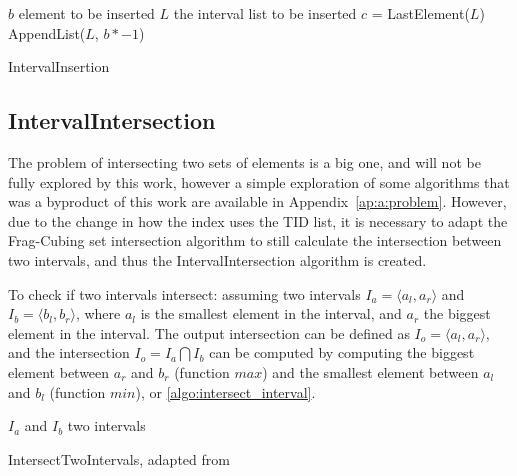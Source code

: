 \begin{algorithm}[H]
\SetAlgoLined
{}
 $b$ element to be inserted\;
 $L$ the interval list to be inserted\;
 $c$ = LastElement($L$)\;
 AppendList($L$, $b * - 1$) 
 \caption{IntervalInsertion}\label{algo:interval_insertion}
\end{algorithm}

\subsection{IntervalIntersection}\label{ch:interval:algo:intersection}

The problem of intersecting two sets of elements is a big one, and will not be fully explored by this work, however a simple exploration of some algorithms that was a byproduct of this work are available in Appendix~\ref{ap:a:problem}.
However, due to the change in how the index uses the TID list, it is necessary to adapt the Frag-Cubing set intersection algorithm to still calculate the intersection between two intervals, and thus the IntervalIntersection algorithm is created.

To check if two intervals intersect: assuming two intervals $I_a = \langle a_l, a_r \rangle$ and $I_b = \langle b_l, b_r \rangle$, where $a_l$ is the smallest element in the interval, and $a_r$ the biggest element in the interval.
The output intersection can be defined as $I_o = \langle a_l, a_r \rangle$, and the intersection $I_o = I_a \bigcap I_b$ can be computed by computing the biggest element between $a_r$ and $b_r$ (function $max$) and the smallest element between $a_l$ and $b_l$ (function $min$), or \autoref{algo:intersect_interval}.

\begin{algorithm}[H]
\SetAlgoLined
{}
 $I_a$ and $I_b$ two intervals\;
  \caption{IntersectTwoIntervals, adapted from \cite{26260}}\label{algo:intersect_interval}
\end{algorithm}

